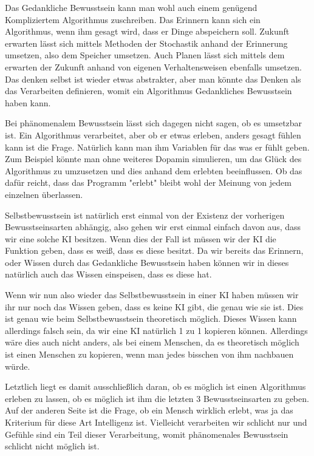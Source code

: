 Das Gedankliche Bewusstsein kann man wohl auch einem genügend Kompliziertem Algorithmus zuschreiben.
Das Erinnern kann sich ein Algorithmus, wenn ihm gesagt wird, dass er Dinge abspeichern soll.
Zukunft erwarten lässt sich mittels Methoden der Stochastik anhand der Erinnerung umsetzen, also dem Speicher umsetzen.
Auch Planen lässt sich mittels dem erwarten der Zukunft anhand von eigenen Verhaltensweisen ebenfalls umsetzen.
Das denken selbst ist wieder etwas abstrakter, aber man könnte das Denken als das Verarbeiten definieren, womit ein Algorithmus Gedankliches Bewusstsein haben kann.

Bei phänomenalem Bewusstsein lässt sich dagegen nicht sagen, ob es umsetzbar ist.
Ein Algorithmus verarbeitet, aber ob er etwas erleben, anders gesagt fühlen kann ist die Frage.
Natürlich kann man ihm Variablen für das was er fühlt geben.
Zum Beispiel könnte man ohne weiteres Dopamin simulieren, um das Glück des Algorithmus zu umzusetzen und dies anhand dem erlebten beeinflussen.
Ob das dafür reicht, dass das Programm "erlebt" bleibt wohl der Meinung von jedem einzelnen überlassen.


Selbstbewusstsein ist natürlich erst einmal von der Existenz der vorherigen Bewusstseinsarten abhängig, also gehen wir erst einmal einfach davon aus, dass wir eine solche KI besitzen.
Wenn dies der Fall ist müssen wir der KI die Funktion geben, dass es weiß, dass es diese besitzt.
Da wir bereits das Erinnern, oder Wissen durch das Gedankliche Bewusstsein haben können wir in dieses natürlich auch das Wissen einspeisen, dass es diese hat.

Wenn wir nun also wieder das Selbstbewusstsein in einer KI haben müssen wir ihr nur noch das Wissen geben, dass es keine KI gibt, die genau wie sie ist.
Dies ist genau wie beim Selbstbewusstsein theoretisch möglich.
Dieses Wissen kann allerdings falsch sein, da wir eine KI natürlich 1 zu 1 kopieren können.
Allerdings wäre dies auch nicht anders, als bei einem Menschen, da es theoretisch möglich ist einen Menschen zu kopieren, wenn man jedes bisschen von ihm nachbauen würde.

Letztlich liegt es damit ausschließlich daran, ob es möglich ist einen Algorithmus erleben zu lassen, ob es möglich ist ihm die letzten 3 Bewusstseinsarten zu geben.
Auf der anderen Seite ist die Frage, ob ein Mensch wirklich erlebt, was ja das Kriterium für diese Art Intelligenz ist.
Vielleicht verarbeiten wir schlicht nur und Gefühle sind ein Teil dieser Verarbeitung, womit phänomenales Bewusstsein schlicht nicht möglich ist.

